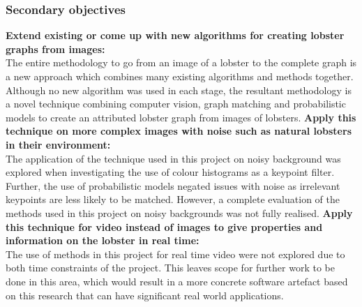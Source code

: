 \subsubsection{Secondary objectives}
\textbf{Extend existing or come up with new algorithms for creating lobster graphs from images:} \\
The entire methodology to go from an image of a lobster to the complete graph is a new approach which combines many existing algorithms and methods together. Although no new algorithm was used in each stage, the resultant methodology is a novel technique combining computer vision, graph matching and probabilistic models to create an attributed lobster graph from images of lobsters.
\n
\textbf{Apply this technique on more complex images with noise such as natural lobsters in their environment:} \\
The application of the technique used in this project on noisy background was explored when investigating the use of colour histograms as a keypoint filter. Further, the use of probabilistic models negated issues with noise as irrelevant keypoints are less likely to be matched. However, a complete evaluation of the methods used in this project on noisy backgrounds was not fully realised. 
\n
\textbf{Apply this technique for video instead of images to give properties and information on the lobster in real time:} \\
The use of methods in this project for real time video were not explored due to both time constraints of the project. This leaves scope for further work to be done in this area, which would result in a more concrete software artefact based on this research that can have significant real world applications.  
